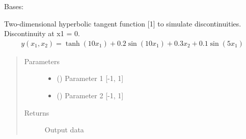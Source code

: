 \documentclass[letterpaper,10pt,english,openany,oneside]{sphinxmanual}
\begin{document}
\begin{fulllineitems}
\label{\detokenize{pygpc.testfunctions:pygpc.testfunctions.testfunctions.HyperbolicTangent}}
Bases: {\hyperref[\detokenize{pygpc:pygpc.AbstractModel.AbstractModel}]{}}

Two-dimensional hyperbolic tangent function {[}1{]} to simulate discontinuities. Discontinuity at x1 = 0.
\begin{equation*}
\begin{split}y(x_1, x_2) = \tanh(10 x_1) + 0.2 \sin(10 x_1) + 0.3 x_2 + 0.1 \sin(5 x_1)\end{split}
\end{equation*}\begin{quote}\begin{description}
\item[{Parameters}] \leavevmode\begin{itemize}
\item {} 
\sphinxstyleliteralstrong{\sphinxupquote{{[}}}\sphinxstyleliteralstrong{\sphinxupquote{{]}}} (\sphinxstyleliteralemphasis{\sphinxupquote{ {[}}}\sphinxstyleliteralemphasis{\sphinxupquote{{]}}}) \textendash{} Parameter 1 {[}-1, 1{]}

\item {} 
\sphinxstyleliteralstrong{\sphinxupquote{{[}}}\sphinxstyleliteralstrong{\sphinxupquote{{]}}} (\sphinxstyleliteralemphasis{\sphinxupquote{ {[}}}\sphinxstyleliteralemphasis{\sphinxupquote{{]}}}) \textendash{} Parameter 2 {[}-1, 1{]}

\end{itemize}

\item[{Returns}] \leavevmode
{} \textendash{} Output data


\end{description}
\end{quote}
\end{fulllineitems}
\end{document}
